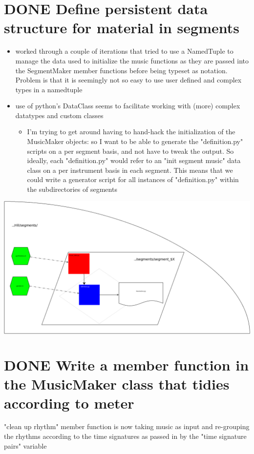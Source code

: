 \documentclass[11pt]{article}
\begin{document}
\section*{{\bfseries\sffamily DONE} Define persistent data structure for material in segments}
\label{sec:org627f3e2}
\begin{itemize}
\item worked through a couple of iterations that tried to use a NamedTuple to manage the data used to initialize the music functions as they are passed into the SegmentMaker member functions before being typeset as notation. Problem is that it is seemingly not so easy to use user defined and complex types in a namedtuple

\item use of python's DataClass seems to facilitate working with (more) complex datatypes and custom classes

\begin{itemize}
\item I'm trying to get around having to hand-hack the initialization of the MusicMaker objects: so I want to be able to generate the "definition.py" scripts on a per segment basis, and not have to tweak the output. So ideally, each "definition.py" would refer to an "init segment music" data class on a per instrument basis in each segment. This means that we could write a generator script for all instances of "definition.py" within the subdirectories of segments
\end{itemize}
\end{itemize}
\begin{center}
\includegraphics[width=.9\linewidth]{./segment_DataFlow.png}
\end{center}
\section*{{\bfseries\sffamily DONE} Write a member function in the MusicMaker class that tidies according to meter}
\label{sec:orgf866104}
"clean up rhythm" member function is now taking music as input and re-grouping the rhythms according to the time signatures as passed in by the "time signature pairs" variable
\end{document}
